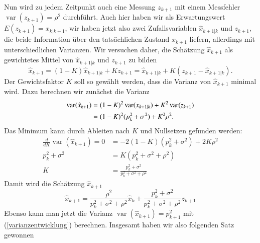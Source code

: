 Nun wird zu jedem Zeitpunkt auch eine Messung $z_{k+1}$ mit einem Messfehler
$\operatorname{var}(z_{k+1})=\rho^2$ durchführt.
Auch hier haben wir als
Erwartungswert $E(z_{k+1})=x_{k|k+1}$, wir haben jetzt also zwei Zufallsvariablen
$\hat x_{k+1|k}$ und $z_{k+1}$, die beide Information über den tatsächlichen
Zustand $x_{k+1}$ liefern, allerdings mit unterschiedlichen Varianzen.
Wir
versuchen daher, die Schätzung $\hat x_{k+1}$ als gewichtetes Mittel 
von $\hat x_{k+1|k}$ und $z_{k+1}$ zu bilden
\begin{equation}
\hat x_{k+1}=(1-K)\hat x_{k+1|k}+Kz_{k+1}=\hat x_{k+1|k}+K( z_{k+1} - \hat x_{k+1|k}).
\label{1dimentwicklung}
\end{equation}
Der Gewichtsfaktor $K$ soll so gewählt werden, dass die Varianz von $\hat x_{k+1}$
minimal wird.
Dazu berechnen wir zunächst die Varianz
\begin{align}
\operatorname{var}(\hat x_{k+1})
&=
(1-K)^2\operatorname{var}(x_{k+1|k})+K^2\operatorname{var}(z_{k+1})\notag\\
&=(1-K)^2(p_k^2+\sigma^2)+K^2\rho^2.\label{varianzentwicklung}
\end{align}
Das Minimum kann durch Ableiten nach $K$ und Nullsetzen gefunden werden:
\begin{align*}
\frac{d}{dK}\operatorname{var}(\hat x_{k+1})
=0&=
-2(1-K)(p_k^2+\sigma^2)+2K\rho^2\\
p_k^2+\sigma^2&=K(p_k^2+\sigma^2+\rho^2)\\
K&=\frac{p_k^2+\sigma^2}{p_k^2+\sigma^2+\rho^2}
\end{align*}
Damit wird die Schätzung $\hat x_{k+1}$
\[
\hat x_{k+1}=\frac{\rho^2}{p_k^2+\sigma^2+\rho^2}\hat x_k+\frac{p_k^2+\sigma^2}{p_k^2+\sigma^2+\rho^2}z_{k+1}
\]
Ebenso kann man jetzt die Varianz $\operatorname{var}(\hat x_{k+1})=p_{k+1}^2$
mit (\ref{varianzentwicklung}) berechnen.
Insgesamt haben wir also folgenden
Satz gewonnen

